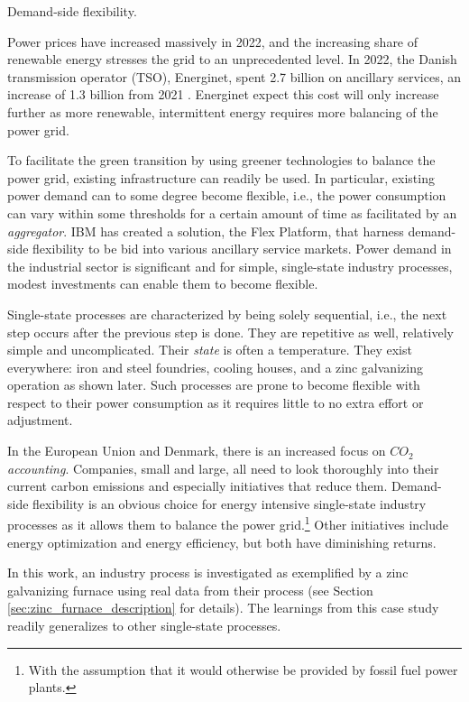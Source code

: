 \documentclass[lettersize,journal]{IEEEtran}
\begin{document}
\begin{IEEEkeywords}
    Demand-side flexibility.
\end{IEEEkeywords}



Power prices have increased massively in 2022, and the increasing share of renewable energy stresses the grid to an unprecedented level. In 2022, the Danish transmission operator (TSO), Energinet, spent 2.7 billion on ancillary services, an increase of 1.3 billion from 2021 \cite{energinetOmkostninger}. Energinet expect this cost will only increase further as more renewable, intermittent energy requires more balancing of the power grid.

To facilitate the green transition by using greener technologies to balance the power grid, existing infrastructure can readily be used. In particular, existing power demand can to some degree become flexible, i.e., the power consumption can vary within some thresholds for a certain amount of time as facilitated by an \textit{aggregator}. IBM has created a solution, the Flex Platform, that harness demand-side flexibility to be bid into various ancillary service markets. Power demand in the industrial sector is significant and for simple, single-state industry processes, modest investments can enable them to become flexible.

Single-state processes are characterized by being solely sequential, i.e., the next step occurs after the previous step is done. They are repetitive as well, relatively simple and uncomplicated. Their \textit{state} is often a temperature. They exist everywhere: iron and steel foundries, cooling houses, and a zinc galvanizing operation as shown later. Such processes are prone to become flexible with respect to their power consumption as it requires little to no extra effort or adjustment.

In the European Union and Denmark, there is an increased focus on $CO_{2}$ \textit{accounting}. Companies, small and large, all need to look thoroughly into their current carbon emissions and especially initiatives that reduce them. Demand-side flexibility is an obvious choice for energy intensive single-state industry processes as it allows them to balance the power grid.\footnote{With the assumption that it would otherwise be provided by fossil fuel power plants.} Other initiatives include energy optimization and energy efficiency, but both have diminishing returns.

In this work, an industry process is investigated as exemplified by a zinc galvanizing furnace using real data from their process (see Section \ref{sec:zinc_furnace_description} for details). The learnings from this case study readily generalizes to other single-state processes.
\end{document}
